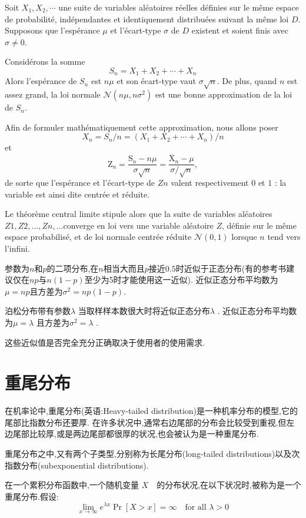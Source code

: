 \documentclass{article}
\begin{document}
Soit $X_1, X_2, \cdots$ une suite de variables al\'eatoires r\'eelles d\'efinies sur le m\^eme espace de probabilit\'e, ind\'ependantes et identiquement distribu\'ees suivant la m\^eme loi $D$. Supposons que l'esp\'erance $\mu$ et l'\'ecart-type $\sigma$ de $D$ existent et soient finis avec $\sigma \neq 0$.

Consid\'erons la somme
$$S_n = X_1 + X_2 + \cdots + X_n$$
Alors l'esp\'erance de $S_n$ est $n\mu$ et
son \'ecart-type vaut $\sigma \sqrt{n}$.
De plus, quand $n$ est assez grand, la loi normale $\mathcal{N}(n \mu,n \sigma^2)$ est une bonne approximation de la loi de $S_n$.

Afin de formuler math\'ematiquement cette approximation, nous allons poser
$$ X_n = S_n/n = (X_1 + X_2 + \cdots + X_n)/n $$
et
$$ \mathrm{Z}_n = \frac{\mathrm{S}_n - n \mu}{\sigma \sqrt{n}} = \frac{\overline{\mathrm{X}}_n - \mu}{\sigma/\sqrt{n}}, $$
de sorte que l'esp\'erance et l'\'ecart-type de $Zn$ valent respectivement $0$ et $1$ : la variable est ainsi dite centr\'ee et r\'eduite.

Le th\'eor\`eme central limite stipule alors que la suite de variables al\'eatoires $Z1, Z2,..., Zn,... $converge en loi vers une variable al\'eatoire $Z$,
d\'efinie sur le m\^eme espace probabilis\'e, et de loi normale centr\'ee r\'eduite $\mathcal{N} (0, 1)$ lorsque $n$ tend vers l'infini.

参数为$n$和$p$的二项分布,在$n$相当大而且$p$接近$0.5$时近似于正态分布(有的参考书建议仅在$np$与$n(1-p)$至少为5时才能使用这一近似).
近似正态分布平均数为$\mu =np$且方差为$\sigma ^{2}=np(1-p)$.

泊松分布带有参数$\lambda$ 当取样样本数很大时将近似正态分布$\lambda$ .
近似正态分布平均数为$\mu =\lambda$ 且方差为$\sigma ^{2}=\lambda$ .

这些近似值是否完全充分正确取决于使用者的使用需求.

\section{重尾分布}
在机率论中,重尾分布(英语:Heavy-tailed distribution)是一种机率分布的模型,它的尾部比指数分布还要厚.
在许多状况中,通常右边尾部的分布会比较受到重视,但左边尾部比较厚,或是两边尾部都很厚的状况,也会被认为是一种重尾分布.

重尾分布之中,又有两个子类型,分别称为长尾分布(long-tailed distributions)以及次指数分布(subexponential distributions).

在一个累积分布函数中,一个随机变量 $X$　的分布状况,在以下状况时,被称为是一个重尾分布.假设:
$$ \lim_{x \to \infty} e^{\lambda x}\Pr[X>x] = \infty \quad \mbox{for all } \lambda>0 $$
\end{document}
